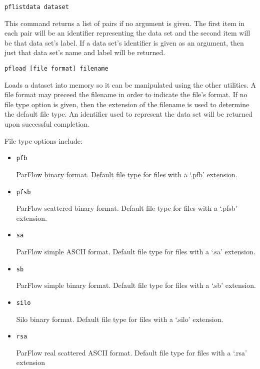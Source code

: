 \begin{description}
\item{\begin{verbatim}pflistdata dataset\end{verbatim}}
This command returns a list of pairs if no argument is given.  The
first item in each pair will be an identifier representing the data   
set and the second item will be that data set's label.  If a data     
set's identifier is given as an argument, then just that data set's   
name and label will be returned.
       

\item{\begin{verbatim}pfload [file format] filename\end{verbatim}}
Loads a dataset into memory so it can be manipulated using the other
utilities.  A file format may preceed the filename in order to
indicate the file's format.  If no file type option is given, then the
extension of the filename is used to determine the default file type.
An identifier used to represent the data set will be returned upon
successful completion.

      File type options include:
\begin{itemize}
\item{\begin{verbatim}pfb\end{verbatim}} ParFlow binary format.  
Default file type for files with a `.pfb' extension.
\item{\begin{verbatim}pfsb\end{verbatim}}  ParFlow scattered binary format.
Default file type for files with a `.pfsb' extension.
\item{\begin{verbatim}sa\end{verbatim}}  ParFlow simple ASCII format.
Default file type for files with a `.sa' extension.
\item{\begin{verbatim}sb\end{verbatim}} ParFlow simple binary format.
Default file type for files with a `.sb' extension.
\item{\begin{verbatim}silo\end{verbatim}} Silo binary format.
Default file type for files with a `.silo' extension.
\item{\begin{verbatim}rsa\end{verbatim}} ParFlow real scattered ASCII format.
Default file type for files with a `.rsa' extension
\end{itemize}
      


\end{description}
